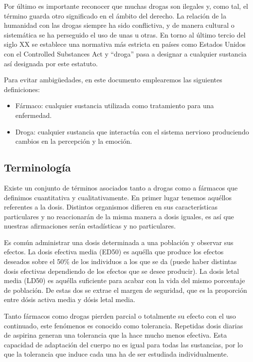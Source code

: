 Por último es importante reconocer que muchas drogas son ilegales y, como tal, el término guarda otro significado en el ámbito del derecho. La relación de la humanidad con las drogas siempre ha sido conflictiva, y de manera cultural o sistemática se ha perseguido el uso de unas u otras. En torno al último tercio del siglo XX se establece una normativa más estricta en países como Estados Unidos con el Controlled Substances Act y \enquote{droga} pasa a designar a cualquier sustancia así designada por este estatuto.

Para evitar ambigüedades, en este documento emplearemos las siguientes definiciones:

\begin{itemize}
	\item Fármaco: cualquier sustancia utilizada como tratamiento para una enfermedad.
	\item Droga: cualquier sustancia que interactúa con el sistema nervioso produciendo cambios en la percepción y la emoción.
\end{itemize}

\subsection{Terminología}

Existe un conjunto de términos asociados tanto a drogas como a fármacos que definimos cuantitativa y cualitativamente. En primer lugar tenemos aquéllos referentes a la dosis. Distintos organismos difieren en sus características particulares y no reaccionarán de la misma manera a dosis iguales, es así que nuestras afirmaciones serán estadísticas y no particulares.

Es común administrar una dosis determinada a una población y observar sus efectos. La dosis efectiva media (ED50) es aquélla que produce los efectos deseados sobre el 50\% de los individuos a los que se da (puede haber distintas dosis efectivas dependiendo de los efectos que se desee producir). La dosis letal media (LD50) es aquélla suficiente para acabar con la vida del mismo porcentaje de población. De estas dos se extrae el margen de seguridad, que es la proporción entre dósis activa media y dósis letal media.

Tanto fármacos como drogas pierden parcial o totalmente su efecto con el uso continuado, este fenómenos es conocido como tolerancia. Repetidas dosis diarias de aspirina generan una tolerancia que la hace mucho menos efectiva. Esta capacidad de adaptación del cuerpo no es igual para todas las sustancias, por lo que la tolerancia que induce cada una ha de ser estudiada individualmente.

